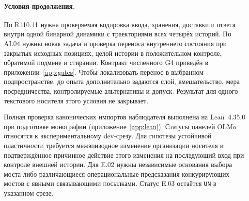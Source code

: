 \paragraph{Условия продолжения.}
По R110.11 нужна проверяемая кодировка ввода, хранения, доставки и
ответа внутри одной бинарной динамики с траекториями всех четырёх историй.
По AI.04 нужны новая задача и проверка переноса внутреннего состояния при
закрытых исходных позициях, целой истории в положительном контроле,
обратимой подмене и стирании. Контракт численного G4 приведён в
приложении~\ref{app:gates}. Чтобы локализовать перенос в выбранном
подпространстве, до опыта дополнительно задаются слой, вмешательство, мера
посредничества, контролируемые альтернативы и допуск. Результат для одного
текстового носителя этого условия не закрывает.

Полная проверка канонических импортов наблюдателя выполнена на Lean~4.35.0
при подготовке монографии (приложение~\ref{app:lean}). Статусы панелей OLMo
относятся к экспериментальному dev-срезу. Для гипотезы устойчивой
пластичности требуется межэпизодное
изменение организации носителя и подтверждённое причинное действие этого
изменения на последующий вход при контроле внешней истории. Для E.02
нужны независимые основания выбора моста либо различающиеся операциональные
предсказания конкурирующих мостов с явными связывающими посылками.
Статус E.03 остаётся \texttt{UN} в указанном срезе.
